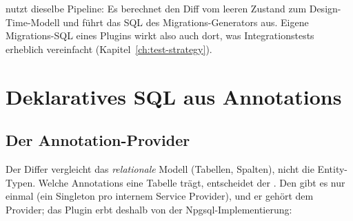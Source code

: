 \begin{note}
   nutzt dieselbe
  Pipeline: Es berechnet den Diff vom leeren Zustand zum Design-Time-Modell und führt das
  SQL des Migrations-Generators aus. Eigene Migrations-SQL eines Plugins wirkt also auch
  dort, was Integrationstests erheblich vereinfacht (Kapitel~\ref{ch:test-strategy}).
\end{note}

\chapter{Deklaratives SQL aus Annotations}\label{ch:declarative-sql-from-annotations}

\section{Der Annotation-Provider}

Der Differ vergleicht das \emph{relationale} Modell (Tabellen, Spalten), nicht die
Entity-Typen. Welche Annotations eine Tabelle trägt, entscheidet der
. Den gibt es nur einmal (ein
Singleton pro internem Service Provider), und er gehört dem Provider; das Plugin erbt deshalb von der Npgsql-Implementierung:

